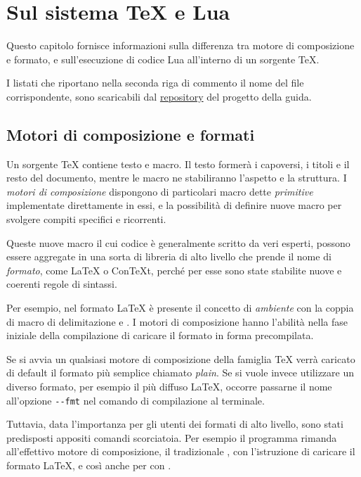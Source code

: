 

\chapter{Sul sistema \TeX{} e Lua}
\label{iichExplain}

Questo capitolo fornisce informazioni sulla differenza tra motore di
composizione e formato, e sull'esecuzione di codice Lua all'interno di un
sorgente \TeX.

I listati che riportano nella seconda riga di commento il nome del file
corrispondente, sono scaricabili dal
\href{https://github.com/GuITeX/guidalua}{repository} del progetto della guida.


\section{Motori di composizione e formati}

Un sorgente \TeX{} contiene testo e macro. Il testo formerà i capoversi, i
titoli e il resto del documento, mentre le macro ne stabiliranno l'aspetto e
la struttura. I \emph{motori di composizione} dispongono di particolari macro
dette \emph{primitive} implementate direttamente in essi, e la possibilità di
definire nuove macro per svolgere compiti specifici e ricorrenti.

Queste nuove macro il cui codice è generalmente scritto da veri esperti,
possono essere aggregate in una sorta di libreria di alto livello che prende
il nome di \emph{formato}, come \LaTeX{} o Con\TeX t, perché per esse sono
state stabilite nuove e coerenti regole di sintassi.

Per esempio, nel formato \LaTeX{} è presente il concetto di \emph{ambiente}
con la coppia di macro di delimitazione  e . I motori di
composizione hanno l'abilità nella fase iniziale della compilazione di
caricare il formato in forma precompilata.

Se si avvia un qualsiasi motore di composizione della famiglia \TeX{} verrà
caricato di default il formato più semplice chiamato \emph{plain}. Se si vuole
invece utilizzare un diverso formato, per esempio il più diffuso \LaTeX{},
occorre passarne il nome all'opzione \texttt{-{}-fmt} nel comando di
compilazione al terminale.

Tuttavia, data l'importanza per gli utenti dei formati di alto livello, sono
stati predisposti appositi comandi scorciatoia. Per esempio il programma
 rimanda all'effettivo motore di composizione, il tradizionale
, con l'istruzione di caricare il formato \LaTeX{}, e così anche
per  con .

